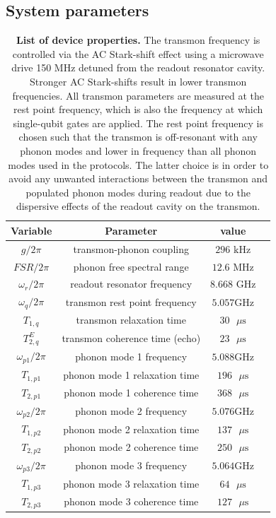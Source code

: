 \documentclass[12pt]{article}
\begin{document}
\subsection{System parameters}
\begin{table}[h]
\label{param_table}
\centering

\renewcommand{\arraystretch}{0.7}
\begin{tabular}{| c | c | c |c }
\hline
\textbf{Variable} & \textbf{Parameter} & \textbf{value}\\ \hline
$g/2\pi$ & transmon-phonon coupling & $296 \text{ kHz}$ \\
$FSR/2\pi$ & phonon free spectral range & $12.6 \text{ MHz}$ \\
$\omega_r/2\pi$ & readout resonator frequency & $8.668 \text{ GHz}$ \\
\hline
\hline
$\omega_{q}/2\pi$ & transmon rest point frequency & $5.057\text{GHz}$\\
$T_{1,q}$ & transmon relaxation time & $30 \text{ $\mu$s}$ \\
$T^{E}_{2, q}$ & transmon coherence time (echo)& $23 \text{ $\mu$s}$ \\
\hline
\hline
$\omega_{p1}/2\pi$ & phonon mode 1 frequency & $5.088\text{GHz}$\\
$T_{1, p1}$ & phonon mode 1 relaxation time & $196\text{ $\mu$s}$\\
$T_{2, p1}$ & phonon mode 1 coherence time& $368\text{ $\mu$s}$ \\
\hline
$\omega_{p2}/2\pi$ & phonon mode 2 frequency & $5.076\text{GHz}$\\
$T_{1, p2}$ & phonon mode 2 relaxation time & $ 137\text{ $\mu$s}$\\
$T_{2, p2}$ & phonon mode 2 coherence time& $ 250\text{ $\mu$s}$ \\
\hline
$\omega_{p3}/2\pi$ & phonon mode 3 frequency & $5.064\text{GHz}$\\
$T_{1, p3}$ & phonon mode 3 relaxation time & $ 64\text{ $\mu$s}$\\
$T_{2, p3}$ & phonon mode 3 coherence time& $ 127\text{ $\mu$s}$ \\
\hline
\end{tabular}

\caption{\textbf{List of device properties.} The transmon frequency is controlled via the AC Stark-shift effect using a microwave drive 150 MHz detuned from the readout resonator cavity. Stronger AC Stark-shifts result in lower transmon frequencies. All transmon parameters are measured at the rest point frequency, which is also the frequency at which single-qubit gates are applied. The rest point frequency is chosen such that the transmon is off-resonant with any phonon modes and lower in frequency than all phonon modes used in the protocols. The latter choice is in order to avoid any unwanted interactions between the transmon and populated phonon modes during readout due to the dispersive effects of the readout cavity on the transmon.}
\label{simulation_params}
\end{table}
\end{document}
